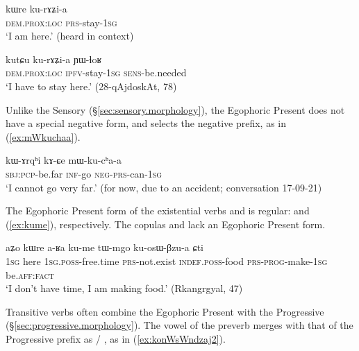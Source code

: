 \begin{exe}
\ex \label{ex:kurAZia.egoph}
\gll kɯre ku-rɤʑi-a \\
\textsc{dem}.\textsc{prox}:\textsc{loc} \textsc{prs}-stay-\textsc{1sg} \\
\glt `I am here.' (heard in context)
\end{exe}

\begin{exe}
\ex \label{ex:kurAZia.ipfv}
\gll kutɕu ku-rɤʑi-a ɲɯ-ɬoʁ \\
\textsc{dem}.\textsc{prox}:\textsc{loc} \textsc{ipfv}-stay-\textsc{1sg} \textsc{sens}-be.needed \\
\glt `I have to stay here.' (28-qAjdoskAt, 78)
\end{exe}

Unlike the Sensory (§\ref{sec:sensory.morphology}), the Egophoric Present does not have a special negative form, and selects the  negative prefix, as in (\ref{ex:mWkuchaa}).

\begin{exe}
\ex \label{ex:mWkuchaa}
\gll kɯ-ɤrqʰi kɤ-ɕe mɯ-ku-cʰa-a \\
\textsc{sbj}:\textsc{pcp}-be.far \textsc{inf}-go \textsc{neg}-\textsc{prs}-can-\textsc{1sg} \\
\glt `I cannot go very far.' (for now, due to an accident; conversation 17-09-21)
\end{exe}

The Egophoric Present form of the existential verbs  and  is regular:  and  (\ref{ex:kume}), respectively. The copulas  and  lack an Egophoric Present form.

\begin{exe}
	\ex \label{ex:kume}
	\gll aʑo kɯre a-ʁa ku-me tɯ-mgo ku-osɯ-βzu-a ɕti \\
	\textsc{1sg} here \textsc{1sg}.\textsc{poss}-free.time \textsc{prs}-not.exist \textsc{indef}.\textsc{poss}-food \textsc{prs}-\textsc{prog}-make-\textsc{1sg} be.\textsc{aff}:\textsc{fact}\\
	\glt `I don't have time, I am making food.'  (Rkangrgyal, 47)
\end{exe}

Transitive verbs often combine the Egophoric Present with the Progressive  (§\ref{sec:progressive.morphology}). The vowel of the preverb merges with that of the Progressive prefix as  / , as in (\ref{ex:konWsWndzaj2}).

